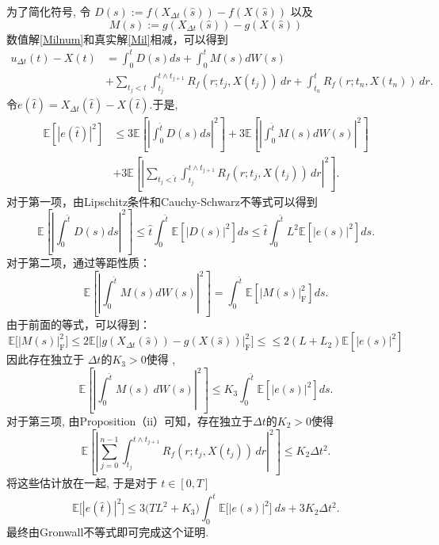 \documentclass[12pt,final]{article}
\makeatletter
\numberwithin{equation}{section}
\numberwithin{figure}{section}
\numberwithin{table}{section}
\theoremstyle{plain}
\renewcommand{\proofname}{proof}
\theoremstyle{Definition}
\theoremstyle{Remark}
\renewenvironment{proof}[1][\proofname]{\par
	\pushQED{\qed}%
	\normalfont \topsep6\p@\@plus6\p@\relax
	\trivlist\item[\hskip\labelsep
	\bfseries #1\@addpunct{\,:\,}]\ignorespaces
}{%
	\popQED\endtrivlist\@endpefalse
}
\makeatother
\begin{document}
	\begin{proof}
		为了简化符号, 令 $D(s):=f(X_{\Delta t}(\hat{s}))-f(X(\hat{s}))$ 以及
		$$M(s):=g(X_{\Delta t}(\hat{s}))-g(X(\hat{s}))$$
		数值解\ref{Milnum}和真实解\ref{Mil}相减，可以得到
		\begin{align}
			u_{\Delta t}(t)-X(t)& = \int_{0}^{t}D(s) ds+\int_{0}^{t}M(s) dW(s) \\
			&+\sum_{t_{j}<t}\int_{t_{j}}^{t\wedge t_{j+1}}R_{f}(r;t_{j},X(t_{j})) \, dr+\int_{t_n}^{t}R_{f}(r;t_n,X(t_{n})) \, dr. 
		\end{align}
		令$ e(\hat{t} )=X_{\Delta t}(\hat{t} )-X(\hat{t} ).  $于是,
		\begin{align}
			\mathbb{E}\left[\left|e(\hat{t})\right|^2\right]& \leq3\mathbb{E}\left[\left|\int_0^{\hat{t}}D(s) ds\right|^2\right]+3\mathbb{E}\left[\left|\int_0^{\hat{t}}M(s) dW(s)\right|^2\right] \\
			&+3\mathbb{E}\left[\left|\sum_{t_{j}<\hat{t}}\int_{t_{j}}^{t\wedge t_{j+1}}R_{f}(r;t_{j},X(t_{j})) \, dr\right|^2\right].
		\end{align}
		对于第一项，由Lipschitz条件和Cauchy-Schwarz不等式可以得到
		\begin{equation}
			\mathbb{E}\left[\left|\int_{0}^{\hat{t}}D(s) ds\right|^2\right]\leq\hat{t}\int_{0}^{\hat{t}}\mathbb{E}\left[\left|D(s)\right|^2\right]ds\leq\hat{t}\int_{0}^{\hat{t}}L^{2}\mathbb{E}\left[\left|e(s)\right|^{2}\right]ds.
		\end{equation}
		对于第二项，通过等距性质：
		\begin{equation}
			\mathbb{E}\left[\left|\int_{0}^{\hat{t}}M(s) dW(s)\right|^2\right]= \int_{0}^{\hat{t}}\mathbb{E}\left[\left|M(s)\right|_{\mathrm{F}}^{2}\right]ds.  
		\end{equation}
		由于前面的等式，可以得到：
		\begin{equation}
			\mathbb{E}\Big[\left|M(s)\right|_{\mathrm{F}}^{2}\Big] \leq 2\mathbb{E}\Big[\left|g(X_{\Delta t}(\hat{s}))-g(X(\hat{s}))\right|_{\mathrm{F}}^{2}\Big] \le
			\leq2(L+L_{2}) \mathbb{E}\left[\left|e(s)\right|^2\right]
		\end{equation}
		因此存在独立于 $\Delta t$的$K_3>0$使得 ,
		$$\mathbb{E}\left[\left|\int_0^{\hat{t}}M(s)\:dW(s)\right|^2\right]\leq K_3\int_0^{\hat{t}}\mathbb{E}\left[\left|e(s)\right|^2\right]ds.$$
		对于第三项, 由Proposition（ii）可知，存在独立于$\Delta t$的$K_2>0$使得
		$$\mathbb{E}\left[\left|\sum_{j=0}^{n-1}\int_{t_{j}}^{t\wedge t_{j+1}}R_{f}(r;t_{j},X(t_{j})) \, dr\right|^2\right]\leq K_2\Delta t^2.$$
		将这些估计放在一起, 于是对于 $t\in[0,T]$
		$$\mathbb{E}\Big[\left|e(\hat{t})\right|^2\Big]\leq3\big(TL^2+K_3\big)\int_0^{\hat{t}}\mathbb{E}\Big[\left|e(s)\right|^2\Big]\:ds+3K_2\Delta t^2.$$
		最终由Gronwall不等式即可完成这个证明.
		
	\end{proof}
	
	
	
	
	
	
	
	
	
	
	
	
\end{document}
